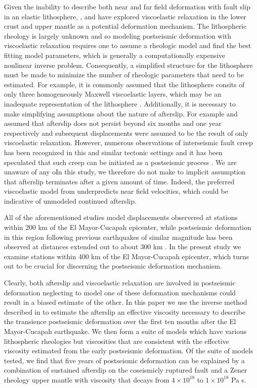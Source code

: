 \documentclass[12pt]{article}
\begin{document}
Given the inability to describe both near and far field deformation with fault slip in an elastic lithosphere, \cite{Pollitz2012}, \cite{Rollins2015} and \cite{Spinler2015} have explored viscoelastic relaxation in the lower crust and upper mantle as a potential deformation mechanism. The lithospheric rheology is largely unknown and so modeling postseismic deformation with viscoelastic relaxation requires one to assume a rheologic model and find the best fitting model parameters, which is generally a computationally expensive nonlinear inverse problem. Consequently, a simplified structure for the lithosphere must be made to minimize the number of rheologic parameters that need to be estimated.  For example, it is commonly assumed that the lithosphere consits of only three homogeneously Maxwell viscoelastic layers, which may be an inadequate representation of the lithosphere \cite{Hines2013}\cite{Riva2009}. Additionally, it is necessary to make simplifying assumptions about the nature of afterslip.  For example \cite{Pollitz2012} and \cite{Spinler2015} assumed that afterslip does not persist beyond six months and one year respectively and subsequent displacements were assumed to be the result of only viscoelastic relaxation. However, numerous observations of interseismic fault creep has been recognized in this and similar tectonic settings and it has been speculated that such creep can be initiated as a postseismic process \cite{Cakir2012} \cite{Cetin2014}.
We are unaware of any oIn this study, we therefore do not make to implicit assumption that afterslip terminates after a given amount of time.  Indeed, the preferred viscoelastic model from \cite{Pollitz2012} underpredicts near field velocities, which could be indicative of unmodeled continued afterslip.

All of the aforementioned studies model displacements observered at stations within 200 km of the El Mayor-Cucapah epicenter, while postseismic deformation in this region following previous earthquakes of similar magnitude has been observed at distances extended out to about 300 km \cite{Freed2007a}. In the present study we examine stations within 400 km of the El Mayor-Cucapah epicenter, which turns out to be crucial for discerning the postseismic deformation mechanism.

Clearly, both afterslip and viscoelastic relaxation are involved in postseismic deformation neglecting to model one of these deformation mechanisms could result in a biased estimate of the other.  In this paper we use the inverse method described in \cite{Hines2015} to estimate the afterslip an effective viscosity necessary to describe the transience postseismic deformation over the first ten months after the El Mayor-Cucapah earthquake. We then form a suite of models which have various lithospheric rheologies but viscosities that are consistent with the effective viscosity estimated from the early postseismic deformation. Of the suite of models tested, we find that five years of postseismic deformation can be explained by a combination of sustained afterslip on the coseismicly ruptured fault and a Zener rheology upper mantle with viscosity that decays from $4\times10^{18}$ to $1\times10^{18}$ Pa s. 
\end{document}

